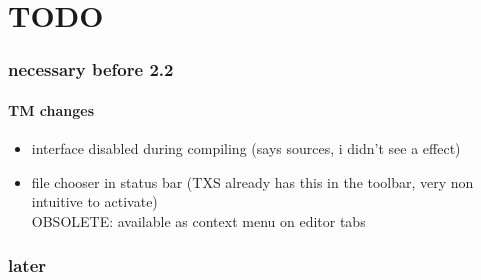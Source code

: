 \documentclass[10pt,a4paper,portrait]{article}
\begin{document}
\pagebreak

\section{TODO}

\subsubsection{necessary before 2.2 }

\paragraph{TM changes}

\begin{itemize}
\item interface disabled during compiling (says sources, i didn't see a effect)
\item file chooser in status bar (TXS already has this in the toolbar, very non intuitive to activate)
\\OBSOLETE: available as context menu on editor tabs
\end{itemize}

\subsubsection{later}
\end{document}
